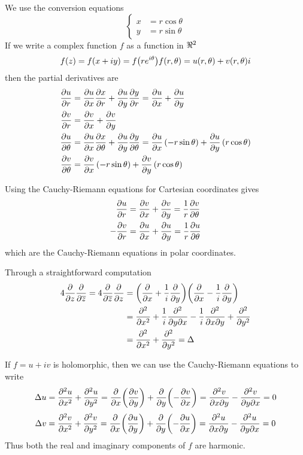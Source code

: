 \begin{exercise}
	
\end{exercise}

\begin{exercise}
	We use the conversion equations
	\[ \begin{cases}
		x &= r\cos\theta \\
		y &= r \sin\theta 
	\end{cases} \]
	If we write a complex function $f$ as a function in $\real^2$
	\[ f(z) = f(x + iy) = f\qty(re^{i\theta}) f(r,\theta) = u(r,\theta) + v(r,\theta) i \]
	then the partial derivatives are
	\begin{align*}
		\pdv{u}{r} &= \pdv{u}{x} \pdv{x}{r} + \pdv{u}{y} \pdv{y}{r} = \pdv{u}{x} (\cos\theta) + \pdv{u}{y} (\sin\theta) \\
		\pdv{v}{r} &= \pdv{v}{x} (\cos\theta) + \pdv{v}{y} (\sin\theta) \\
		\pdv{u}{\theta} &= \pdv{u}{x} \pdv{x}{\theta} + \pdv{u}{y} \pdv{y}{\theta} = \pdv{u}{x}\, ( -r\sin\theta) + \pdv{u}{y}\, ( r\cos\theta) \\
		\pdv{v}{\theta} &= \pdv{v}{x}\, ( -r\sin\theta) + \pdv{v}{y}\, ( r\cos\theta)
	\end{align*}
	
	Using the Cauchy-Riemann equations for Cartesian coordinates gives
	\begin{align*}
		\pdv{u}{r} &= \pdv{v}{x} (\cos\theta) + \pdv{v}{y} (-\sin\theta) = \frac{1}{r} \pdv{v}{\theta} \\
		-\pdv{v}{r} &= \pdv{u}{x} ( -\sin\theta) + \pdv{u}{y} (\cos\theta) = \frac{1}{r} \pdv{u}{\theta} 
	\end{align*}
	which are the Cauchy-Riemann equations in polar coordinates.
\end{exercise}

\begin{exercise}
	Through a straightforward computation
	\begin{align*}
		4 \pdv{z}\pdv{\overline{z}} = 4 \pdv{\overline{z}}\pdv{z} &= \qty(\pdv{x} + \frac{1}{i} \pdv{y}) \qty(\pdv{x} - \frac{1}{i} \pdv{y}) \\
		&= \pdv[2]{}{x} + \frac{1}{i} \pdv{}{y}{x} - \frac{1}{i} \pdv{}{x}{y} + \pdv[2]{}{y} \\
		&= \pdv[2]{}{x} + \pdv[2]{}{y} = \Delta 
	\end{align*}
\end{exercise}

\begin{exercise}
	If $f = u + iv$ is holomorphic, then we can use the Cauchy-Riemann equations to write
	\[ \Delta u = \pdv[2]{u}{x} + \pdv[2]{u}{y} = \pdv{x} \qty(\pdv{v}{y}) + \pdv{y} \qty(-\pdv{v}{x}) = \pdv{v}{x}{y} - \pdv{v}{y}{x} = 0 \]
	\[ \Delta v = \pdv[2]{v}{x} + \pdv[2]{v}{y} = \pdv{x} \qty(\pdv{u}{y}) + \pdv{y} \qty(-\pdv{u}{x}) = \pdv{u}{x}{y} - \pdv{u}{y}{x} = 0 \]
	Thus both the real and imaginary components of $f$ are harmonic.
\end{exercise}

